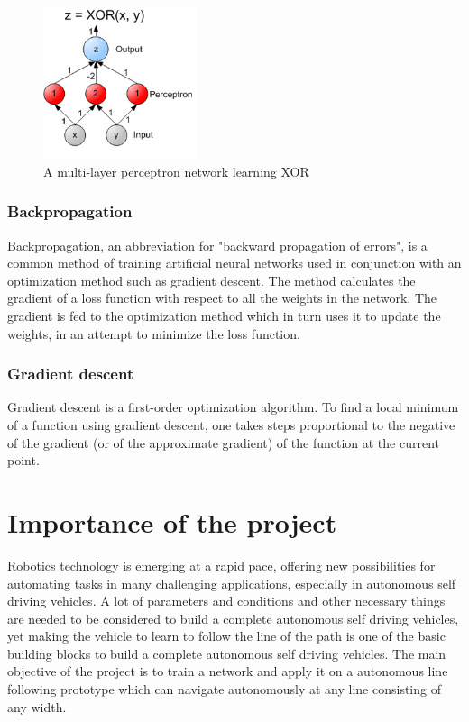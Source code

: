 \documentclass[14pt,a4paper]{extarticle}
\begin{document}
		\begin{figure}[H]
			\includegraphics[width=0.4\textwidth, center]{XOR_perceptron_net.png}
			\caption{A multi-layer perceptron network learning XOR}
		\end{figure}
		
		
	\subsubsection{Backpropagation}
	
	Backpropagation, an abbreviation for "backward propagation of errors", is a common method of training artificial neural networks used in conjunction with an optimization method such as gradient descent. The method calculates the gradient of a loss function with respect to all the weights in the network. The gradient is fed to the optimization method which in turn uses it to update the weights, in an attempt to minimize the loss function.
	
	\subsubsection{Gradient descent}
	Gradient descent is a first-order optimization algorithm. To find a local minimum of a function using gradient descent, one takes steps proportional to the negative of the gradient (or of the approximate gradient) of the function at the current point.


	\section{Importance of the project}
	
	Robotics technology is emerging at a rapid pace, offering new possibilities for automating tasks in many challenging applications, especially in autonomous self driving vehicles. A lot of parameters and conditions and other necessary things are needed to be considered to build a complete autonomous self driving vehicles, yet making the vehicle to learn to follow the line of the path is one of the basic building blocks to build a complete autonomous self driving vehicles. The main objective of the project is to train a network and apply it on a autonomous line following prototype which can navigate autonomously at any line consisting of any width. 
	
\end{document}
